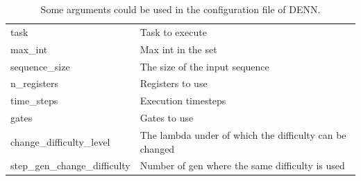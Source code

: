\begin{table}[]
\begin{tabular}{|l|l|}
		\rowcolor{LightGray}\multicolumn{2}{|c|}{\textbf{NRAM}} \\ \hline
		task  	 		& Task to execute \\ \hline
		max\_int  		& Max int in the set \\ \hline
		sequence\_size  & The size of the input sequence \\ \hline
		n\_registers  	& Registers to use \\ \hline
		time\_steps  	& Execution timesteps \\ \hline
		gates  			& Gates to use \\ \hline
		change\_difficulty\_level & The lambda under of which the difficulty can be changed \\ \hline
		step\_gen\_change\_difficulty & Number of gen where the same difficulty is used  \\ \hline

	\end{tabular}
	\caption{Some arguments could be used in the configuration file of DENN.}
	\label{tbl:denn-parameters}
\end{table}